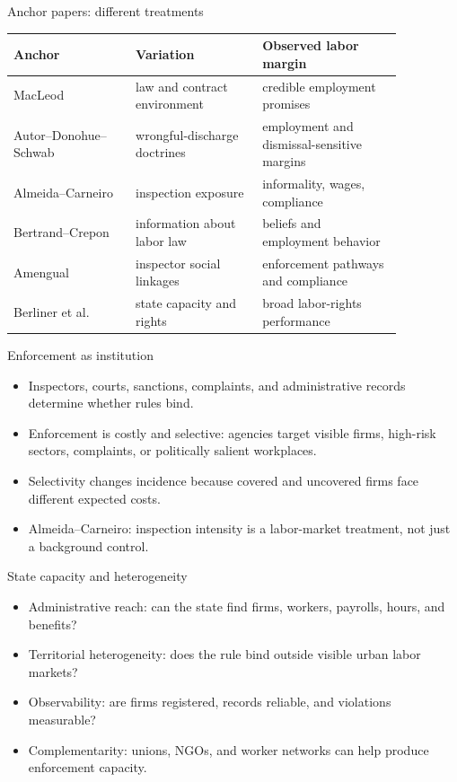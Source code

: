 \documentclass[aspectratio=169,11pt]{beamer}
\begin{document}
\begin{frame}{Anchor papers: different treatments}
\small
\begin{tabular}{p{0.27\linewidth} p{0.28\linewidth} p{0.31\linewidth}}
\toprule
Anchor & Variation & Observed labor margin \\
\midrule
MacLeod & law and contract environment & credible employment promises \\
Autor--Donohue--Schwab & wrongful-discharge doctrines & employment and dismissal-sensitive margins \\
Almeida--Carneiro & inspection exposure & informality, wages, compliance \\
Bertrand--Crepon & information about labor law & beliefs and employment behavior \\
Amengual & inspector social linkages & enforcement pathways and compliance \\
Berliner et al. & state capacity and rights & broad labor-rights performance \\
\bottomrule
\end{tabular}
\end{frame}

\begin{frame}{Enforcement as institution}
\begin{itemize}
    \item Inspectors, courts, sanctions, complaints, and administrative records determine whether rules bind.
    \item Enforcement is costly and selective: agencies target visible firms, high-risk sectors, complaints, or politically salient workplaces.
    \item Selectivity changes incidence because covered and uncovered firms face different expected costs.
    \item Almeida--Carneiro: inspection intensity is a labor-market treatment, not just a background control.
\end{itemize}
\end{frame}

\begin{frame}{State capacity and heterogeneity}
\begin{itemize}
    \item Administrative reach: can the state find firms, workers, payrolls, hours, and benefits?
    \item Territorial heterogeneity: does the rule bind outside visible urban labor markets?
    \item Observability: are firms registered, records reliable, and violations measurable?
    \item Complementarity: unions, NGOs, and worker networks can help produce enforcement capacity.
\end{itemize}
\end{frame}
\end{document}
